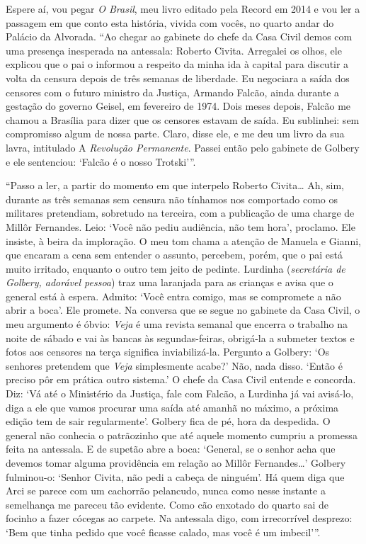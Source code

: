 \normalfont 
Espere aí, vou pegar \emph{O Brasil}, meu livro editado
pela Record em 2014 e vou ler a passagem em que conto esta história,
vivida com vocês, no quarto andar do Palácio da Alvorada. ``Ao chegar ao
gabinete do chefe da Casa Civil demos com uma presença inesperada na
antessala: Roberto Civita. Arregalei os olhos, ele explicou que o pai o
informou a respeito da minha ida à capital para discutir a volta da
censura depois de três semanas de liberdade. Eu negociara a saída dos
censores com o futuro ministro da Justiça, Armando Falcão, ainda durante
a gestação do governo Geisel, em fevereiro de 1974. Dois meses depois,
Falcão me chamou a Brasília para dizer que os censores estavam de saída.
Eu sublinhei: sem compromisso algum de nossa parte. Claro, disse ele, e
me deu um livro da sua lavra, intitulado A \emph{Revolução Permanente}.
Passei então pelo gabinete de Golbery e ele sentenciou: `Falcão é o
nosso Trotski'''.

``Passo a ler, a partir do momento em que interpelo Roberto
Civita\ldots{} Ah, sim, durante as três semanas sem censura não tínhamos
nos comportado como os militares pretendiam, sobretudo na terceira, com
a publicação de uma charge de Millôr Fernandes. Leio: `Você não pediu
audiência, não tem hora', proclamo. Ele insiste, à beira da imploração.
O meu tom chama a atenção de Manuela e Gianni, que encaram a cena sem
entender o assunto, percebem, porém, que o pai está muito irritado,
enquanto o outro tem jeito de pedinte. Lurdinha (\emph{secretária de
Golbery, adorável pessoa}) traz uma laranjada para as crianças e avisa
que o general está à espera. Admito: `Você entra comigo, mas se
compromete a não abrir a boca'. Ele promete. Na conversa que se segue no
gabinete da Casa Civil, o meu argumento é óbvio: \emph{Veja} é uma
revista semanal que encerra o trabalho na noite de sábado e vai às
bancas às segundas-feiras, obrigá-la a submeter textos e fotos aos
censores na terça significa inviabilizá-la. Pergunto a Golbery: `Os
senhores pretendem que \emph{Veja} simplesmente acabe?' Não, nada disso.
`Então é preciso pôr em prática outro sistema.' O chefe da Casa Civil
entende e concorda. Diz: `Vá até o Ministério da Justiça, fale com
Falcão, a Lurdinha já vai avisá-lo, diga a ele que vamos procurar uma
saída até amanhã no máximo, a próxima edição tem de sair regularmente'.
Golbery fica de pé, hora da despedida. O general não conhecia o
patrãozinho que até aquele momento cumpriu a promessa feita na
antessala. E de supetão abre a boca: `General, se o senhor acha que
devemos tomar alguma providência em relação ao Millôr Fernandes\ldots{}'
Golbery fulminou-o: `Senhor Civita, não pedi a cabeça de ninguém'. Há
quem diga que Arci se parece com um cachorrão pelancudo, nunca como
nesse instante a semelhança me pareceu tão evidente. Como cão enxotado
do quarto sai de focinho a fazer cócegas ao carpete. Na antessala digo,
com irrecorrível desprezo: `Bem que tinha pedido que você ficasse
calado, mas você é um imbecil'''.

